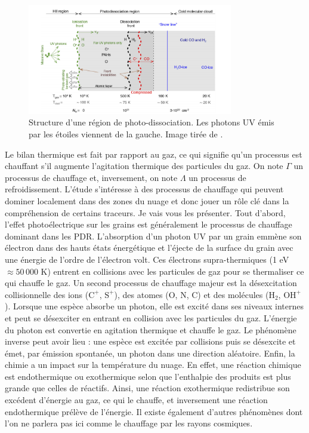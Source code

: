 \documentclass[11pt,a4paper]{article}
\begin{document}
\begin{spacing}{0.98}
\begin{figure}[!h]
    \centering
    \includegraphics[width = 0.8\textwidth]{figure/structurepdr.pdf}
    \caption{Structure d'une région de photo-dissociation. Les photons UV émis par les étoiles viennent de la gauche. Image tirée de \cite{Goicoechea2016}.}
    \label{fig:intro:struct}
\end{figure}
 \newline

Le bilan thermique est fait par rapport au gaz, ce qui signifie qu'un processus est chauffant s'il augmente l'agitation thermique des particules du gaz. On note $\Gamma$ un processus de chauffage et, inversement, on note $\Lambda$ un processus de refroidissement. L'étude s'intéresse à des processus de chauffage qui peuvent dominer localement dans des zones du nuage et donc jouer un rôle clé dans la compréhension de certains traceurs. Je vais vous les présenter. Tout d'abord, l'effet photoélectrique sur les grains est généralement le processus de chauffage dominant dans les PDR. L'absorption d'un photon UV par un grain emmène son électron dans des hauts états énergétique et l'éjecte de la surface du grain avec une énergie de l'ordre de l'électron volt. Ces électrons supra-thermiques (1 eV $\approx 50\,000$ K) entrent en collisions avec les particules de gaz pour se thermaliser ce qui chauffe le gaz. Un second processus de chauffage majeur est la désexcitation collisionnelle des ions ($\mathrm{C}^+$, $\mathrm{S}^+$), des atomes ($\mathrm{O}$, $\mathrm{N}$, $\mathrm{C}$) et des molécules ($\mathrm{H}_2$, $\mathrm{OH}^+$). Lorsque une espèce absorbe un photon, elle est excité dans ses niveaux internes et peut se désexciter en entrant en collision avec les particules du gaz. L'énergie du photon est convertie en agitation thermique et chauffe le gaz. Le phénomène inverse peut avoir lieu : une espèce est excitée par collisions puis se désexcite et émet, par émission spontanée, un photon dans une direction aléatoire. Enfin, la chimie a un impact sur la température du nuage. En effet, une réaction chimique est endothermique ou exothermique selon que l’enthalpie des produits est plus grande que celles de réactifs. Ainsi, une réaction exothermique redistribue son excédent d'énergie au gaz, ce qui le chauffe, et inversement une réaction endothermique prélève de l'énergie. Il existe également d'autres phénomènes dont l'on ne parlera pas ici comme le chauffage par les rayons cosmiques. \newline 


\end{spacing}
\end{document}

